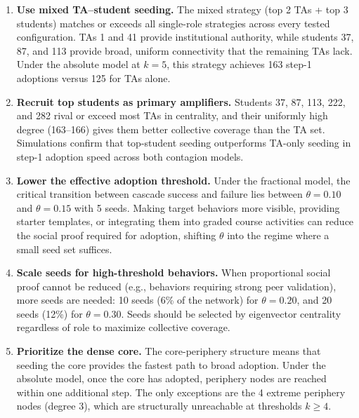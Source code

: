 \documentclass[12pt]{article}
\begin{document}
\begin{enumerate}
    \item \textbf{Use mixed TA--student seeding.} The mixed strategy (top 2 TAs + top 3 students) matches or exceeds all single-role strategies across every tested configuration. TAs 1 and 41 provide institutional authority, while students 37, 87, and 113 provide broad, uniform connectivity that the remaining TAs lack. Under the absolute model at $k = 5$, this strategy achieves 163 step-1 adoptions versus 125 for TAs alone.

    \item \textbf{Recruit top students as primary amplifiers.} Students 37, 87, 113, 222, and 282 rival or exceed most TAs in centrality, and their uniformly high degree (163--166) gives them better collective coverage than the TA set. Simulations confirm that top-student seeding outperforms TA-only seeding in step-1 adoption speed across both contagion models.

    \item \textbf{Lower the effective adoption threshold.} Under the fractional model, the critical transition between cascade success and failure lies between $\theta = 0.10$ and $\theta = 0.15$ with 5 seeds. Making target behaviors more visible, providing starter templates, or integrating them into graded course activities can reduce the social proof required for adoption, shifting $\theta$ into the regime where a small seed set suffices.

    \item \textbf{Scale seeds for high-threshold behaviors.} When proportional social proof cannot be reduced (e.g., behaviors requiring strong peer validation), more seeds are needed: 10 seeds (6\% of the network) for $\theta = 0.20$, and 20 seeds (12\%) for $\theta = 0.30$. Seeds should be selected by eigenvector centrality regardless of role to maximize collective coverage.

    \item \textbf{Prioritize the dense core.} The core-periphery structure means that seeding the core provides the fastest path to broad adoption. Under the absolute model, once the core has adopted, periphery nodes are reached within one additional step. The only exceptions are the 4 extreme periphery nodes (degree 3), which are structurally unreachable at thresholds $k \geq 4$.
\end{enumerate}

\end{document}

